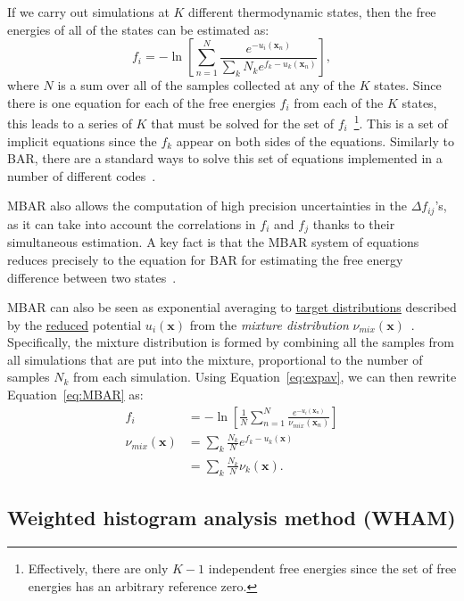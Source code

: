 \documentclass[9pt,review]{livecoms}
\newcommand{\vx}{\mathbf{x}}
\begin{document}
If we carry out simulations at $K$ different thermodynamic states,
then the free energies of all of the states can be estimated as:
\begin{equation}
f_i = -\ln \left[\sum_{n=1}^N \frac{e^{-u_i(\vx_n)}}{\sum_k N_k e^{f_k-u_k(\vx_n)}}\right],
\label{eq:MBAR}
\end{equation}
where $N$ is a sum over all of the samples collected at any of the $K$ states.
Since there is one equation for each of the free energies $f_i$ from each of the $K$ states, this leads to a series of $K$ that must be solved for the set of $f_i$~\footnote{Effectively, there are only $K-1$ independent free energies since the set of free energies has an arbitrary reference zero.}. This is a set of implicit equations since the $f_k$ appear on both sides of the equations. Similarly to BAR, there are a standard ways to solve this set of equations implemented in a number of different codes~\cite{shirts-chodera:jcp:2008:mbar,tan_binless_2012,Zhang:JPCL:2015}.

MBAR also allows the computation of high precision uncertainties in the $\Delta
f_{ij}$'s, as it can take into account the correlations in $f_i$ and
$f_j$ thanks to their simultaneous estimation.  A key fact is that the MBAR system of equations reduces precisely to the equation for BAR for estimating the free energy difference between two states~\cite{shirts-chodera:jcp:2008:mbar}.

MBAR can also be seen as exponential averaging to \hyperlink{ref:targetdist} {target distributions} described by the \hyperlink{ref:reduced} {reduced} potential $u_i(\vx)$ from the \emph{mixture distribution} $\nu_{mix}(\vx)$~\cite{reweighting_mixture_distribution}. Specifically, the mixture distribution is formed by combining all the samples from all simulations that are put into the mixture, proportional to the number of samples $N_k$ from each simulation.  Using Equation~\ref{eq:expav}, we can then rewrite Equation~\ref{eq:MBAR} as:
\begin{align}
f_i &= -\ln \left[\frac{1}{N}\sum_{n=1}^N \frac{e^{-u_i(\vx_n)}}{\nu_{mix}(\vx_n)}\right] \\
\nu_{mix}(\vx) &= \sum_k \frac{N_k}{N} e^{f_k-u_k(\vx)} \nonumber \\
               &= \sum_k \frac{N_k}{N} \nu_k(\vx).
\end{align}


\subsection{Weighted histogram analysis method (WHAM)}
\end{document}
